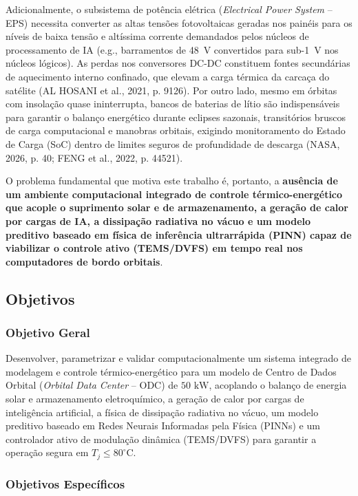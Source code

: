 Adicionalmente, o subsistema de potência elétrica (\textit{Electrical Power System} -- EPS) necessita converter as altas tensões fotovoltaicas geradas nos painéis para os níveis de baixa tensão e altíssima corrente demandados pelos núcleos de processamento de IA (e.g., barramentos de 48~V convertidos para sub-1~V nos núcleos lógicos). As perdas nos conversores DC-DC constituem fontes secundárias de aquecimento interno confinado, que elevam a carga térmica da carcaça do satélite (AL HOSANI et al., 2021, p. 9126). Por outro lado, mesmo em órbitas com insolação quase ininterrupta, bancos de baterias de lítio são indispensáveis para garantir o balanço energético durante eclipses sazonais, transitórios bruscos de carga computacional e manobras orbitais, exigindo monitoramento do Estado de Carga (SoC) dentro de limites seguros de profundidade de descarga (NASA, 2026, p. 40; FENG et al., 2022, p. 44521).

O problema fundamental que motiva este trabalho é, portanto, a \textbf{ausência de um ambiente computacional integrado de controle térmico-energético que acople o suprimento solar e de armazenamento, a geração de calor por cargas de IA, a dissipação radiativa no vácuo e um modelo preditivo baseado em física de inferência ultrarrápida (PINN) capaz de viabilizar o controle ativo (TEMS/DVFS) em tempo real nos computadores de bordo orbitais}.

\subsection{Objetivos}

\subsubsection{Objetivo Geral}

Desenvolver, parametrizar e validar computacionalmente um sistema integrado de modelagem e controle térmico-energético para um modelo de Centro de Dados Orbital (\textit{Orbital Data Center} -- ODC) de $50\text{ kW}$, acoplando o balanço de energia solar e armazenamento eletroquímico, a geração de calor por cargas de inteligência artificial, a física de dissipação radiativa no vácuo, um modelo preditivo baseado em Redes Neurais Informadas pela Física (PINNs) e um controlador ativo de modulação dinâmica (TEMS/DVFS) para garantir a operação segura em $T_j \le 80^\circ\text{C}$.

\subsubsection{Objetivos Específicos}

